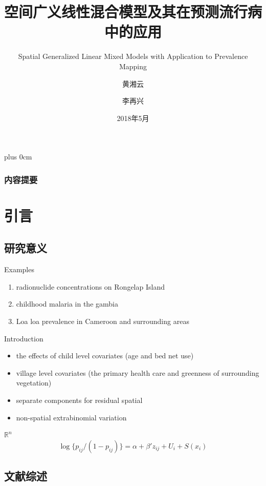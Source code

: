 \documentclass[11pt,compress,xcolor=x11names,UTF8]{ctexbeamer}
\title{空间广义线性混合模型及其在预测流行病中的应用}
\subtitle{Spatial Generalized Linear Mixed Models with Application to Prevalence Mapping}
\author{黄湘云\and 李再兴}
\institute[CUMTB]{理学院\\ 中国矿业大学（北京）}
\date{2018年5月}
\renewcommand{\raggedright}{\leftskip=0pt \rightskip=0pt plus 0cm} %
\begin{document}
\raggedright

\maketitle



\begin{frame}
  \frametitle{内容提要}
  \tableofcontents  
\end{frame}


\section{引言}


\subsection{研究意义}

\begin{frame}{Examples}

\begin{enumerate}
\item radionuclide concentrations on Rongelap Island
\item childhood malaria in the gambia
\item Loa loa prevalence in Cameroon and surrounding areas
\end{enumerate}

\end{frame}

\begin{frame}{Introduction}
\citet{Diggle2002}
\begin{itemize}
\item the effects of child level covariates (age and bed net use)
\item village level covariates (the primary health care and greenness of surrounding vegetation)
\item separate components for residual spatial
\item non-spatial extrabinomial variation
\end{itemize}
$\mathbb{R}^{n}$
$$ \log \{p_{ij}/(1-p_{ij})\} =\alpha + \beta'z_{ij} + U_{i} + S(x_{i})$$

\end{frame}

\subsection{文献综述}
\end{document}
